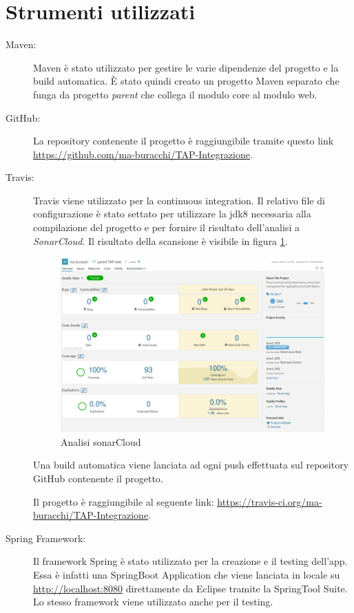 \documentclass[12pt]{article}
\begin{document}
\section{Strumenti utilizzati}
	\begin{description}
		\item[Maven:] Maven è stato utilizzato per gestire le varie dipendenze del progetto e la build automatica. \`{E} stato quindi creato un progetto Maven separato che funga da progetto \emph{parent} che collega il modulo core al modulo web.
		
		\item[GitHub:] La repository contenente il progetto è raggiungibile tramite questo link \url{https://github.com/ma-buracchi/TAP-Integrazione}.
		
		\item[Travis:] Travis viene utilizzato per la continuous integration. Il relativo file di configurazione è stato settato per utilizzare la jdk8 necessaria alla compilazione del progetto e per fornire il risultato dell'analisi a \emph{SonarCloud}. Il risultato della scansione è visibile in figura \ref{fig:sonar}.
		
		\begin{figure}
			\begin{center}
				\includegraphics[scale=.3]{img/sonarCloud}
				\caption{Analisi sonarCloud}
				\label{fig:sonar}
			\end{center}
		\end{figure}
		
		Una build automatica viene lanciata ad ogni push effettuata sul repository GitHub contenente il progetto.
		
		Il progetto è raggiungibile al seguente link: \url{https://travis-ci.org/ma-buracchi/TAP-Integrazione}.
		
		\item[Spring Framework:] Il framework Spring è stato utilizzato per la creazione e il testing dell'app. Essa è infatti una SpringBoot Application che viene lanciata in locale su \url{http://localhost:8080} direttamente da Eclipse tramite la SpringTool Suite. Lo stesso framework viene utilizzato anche per il testing.
	\end{description}
	
\end{document}
